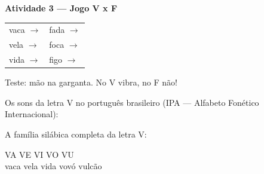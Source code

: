 \begin{consolidacao}
\textbf{Atividade 3 --- Jogo V x F}


\begin{center}
\begin{tabular}{ll}
vaca \quad $\rightarrow$ \underline{\hspace{2cm}} & fada \quad $\rightarrow$ \underline{\hspace{2cm}} \\
vela \quad $\rightarrow$ \underline{\hspace{2cm}} & foca \quad $\rightarrow$ \underline{\hspace{2cm}} \\
vida \quad $\rightarrow$ \underline{\hspace{2cm}} & figo \quad $\rightarrow$ \underline{\hspace{2cm}}
\end{tabular}
\end{center}
Teste: m\~a{}o na garganta. No V vibra, no F n\~a{}o!

\end{consolidacao}


\begin{sonsdaletra}
Os sons da letra V no portugu\^es{} brasileiro (IPA --- Alfabeto Fon\'etico Internacional):

\end{sonsdaletra}


\begin{familiasilabica}
A fam\'ilia sil\'abica completa da letra V:

\begin{center}
VA \quad VE \quad VI \quad VO \quad VU \\[0.5em] vaca \quad vela \quad vida \quad vov\'o \quad vulc\~a{}o
\end{center}
\end{familiasilabica}



